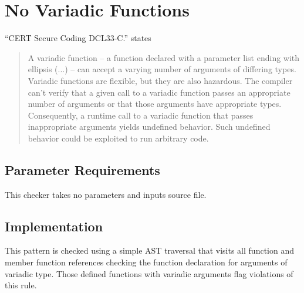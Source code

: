 %
%

\section{No Variadic Functions}
\label{NoVariadicFunctions::overview}

``CERT Secure Coding DCL33-C.'' states
\begin{quote}
A variadic function – a function declared with a parameter list ending with ellipsis (...) – can accept a varying number of arguments of differing types. Variadic functions are flexible, but they are also hazardous. The compiler can't verify that a given call to a variadic function passes an appropriate number of arguments or that those arguments have appropriate types. Consequently, a runtime call to a variadic function that passes inappropriate arguments yields undefined behavior. Such undefined behavior could be exploited to run arbitrary code.
\end{quote}

\subsection{Parameter Requirements}
This checker takes no parameters and inputs source file.

\subsection{Implementation}
This pattern is checked using a simple AST traversal that visits all function
and member function references checking the function declaration for arguments of variadic type. Those defined functions with variadic arguments flag violations of this rule.

